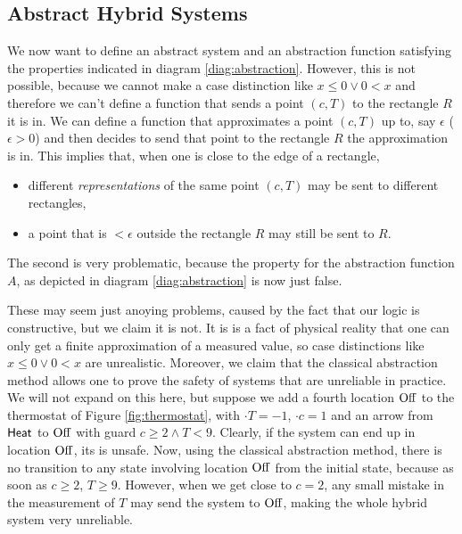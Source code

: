 \documentclass[runningheads]{llncs}
\newcommand{\Heat}{{\sf Heat}}
\newcommand{\Off}{{\rm Off}}
\begin{document}
\subsection{Abstract Hybrid Systems}
\label{abshybsys}
\label{abstraction}
We now want to define an abstract system and an abstraction function
satisfying the properties indicated in diagram
\ref{diag:abstraction}. However, this is not possible, because we
cannot make a case distinction like $x\leq 0 \vee 0< x$ and therefore
we can't define a function that sends a point $(c,T)$ to the rectangle $R$
it is in. We can define a function that approximates a point $(c,T)$
up to, say $\epsilon$ ($\epsilon >0$) and then decides to send that
point to the rectangle $R$ the approximation is in. This implies that,
when one is close to the edge of a rectangle,
\begin{itemize}
\item 
different {\em representations\/} of the same point $(c,T)$ may be
sent to different rectangles,
\item
a point that is $<\epsilon$ outside the rectangle $R$ may still be sent to $R$.
\end{itemize}
The second is very problematic, because the property for the
abstraction function $A$, as depicted in diagram
\ref{diag:abstraction} is now just false.

These may seem just anoying problems,
caused by the fact that our logic is constructive, but we claim it is
not. It is is a fact of physical reality that one can only get a
finite approximation of a measured value, so case distinctions like
$x\leq 0 \vee 0< x$ are unrealistic. Moreover, we claim that the
classical abstraction method allows one to prove the safety of systems
that are unreliable in practice. We will not expand on this here, but
suppose we add a fourth location $\Off$ to the thermostat of Figure
\ref{fig:thermostat}, with $\cdot{T} = -1$, $\cdot{c} =1$ and an arrow
from $\Heat$ to $\Off$ with guard $c\geq 2 \wedge T<9$. Clearly, if
the system can end up in location $\Off$, its is unsafe. Now, using
the classical abstraction method, there is no transition to any state
involving location $\Off$ from the initial state, because as soon as
$c\geq 2$, $T\geq 9$. However, when we get close to $c=2$, any small
mistake in the measurement of $T$ may send the system to $\Off$,
making the whole hybrid system very unreliable.
\end{document}
